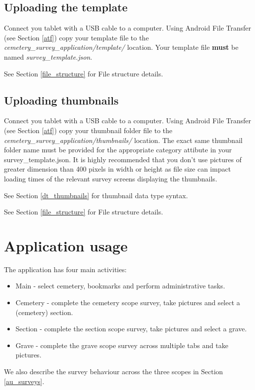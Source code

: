 \documentclass{scrreprt}
\begin{document}
\section{Uploading the template}
Connect you tablet with a USB cable to a computer. Using Android File Transfer (see Section \ref{atf}) copy your template file to the \textit{cemetery_survey_application/template/} location. Your template file \textbf{must} be named \textit{survey_template.json}.

See Section \ref{file_structure} for File structure details.

\section{Uploading thumbnails}
\label{upload_thumbnails}
Connect you tablet with a USB cable to a computer. Using Android File Transfer (see Section \ref{atf}) copy your thumbnail folder file to the \textit{cemetery_survey_application/thumbnails/} location. The exact same thumbnail folder name must be provided for the appropriate category attibute in your survey_template.json. It is highly recommended that you don't use pictures of greater dimension than 400 pixels in width or height as file size can impact loading times of the relevant survey screens displaying the thumbnails.

See Section \ref{dt_thumbnails} for thumbnail data type syntax.

See Section \ref{file_structure} for File structure details.

\chapter{Application usage}
The application has four main activities:
\begin{itemize}
\item Main - select cemetery, bookmarks and perform administrative tasks.
\item Cemetery - complete the cemetery scope survey, take pictures and select a (cemetery) section.
\item Section - complete the section scope survey, take pictures and select a grave.
\item Grave - complete the grave scope survey across multiple tabs and take pictures.
\end{itemize}

We also describe the survey behaviour across the three scopes in Section \ref{au_surveys}.
\end{document}
